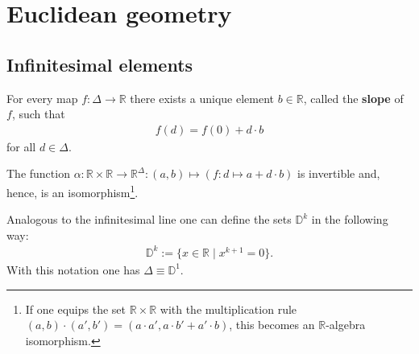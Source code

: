 \section{Euclidean geometry}
\subsection{Infinitesimal elements}


    \begin{axiom}\label{synth:kock_lawvere_axiom}
        For every map $f:\Delta\rightarrow\mathbb{R}$ there exists a unique element $b\in\mathbb{R}$, called the \textbf{slope} of $f$, such that
        \begin{gather}
            f(d) = f(0) + d\cdot b
        \end{gather}
        for all $d\in\Delta$.
    \end{axiom}
    \begin{result}
        The function $\alpha:\mathbb{R}\times\mathbb{R}\rightarrow \mathbb{R}^\Delta:(a,b)\mapsto(f:d\mapsto a+d\cdot b)$ is invertible and, hence, is an isomorphism\footnote{If one equips the set $\mathbb{R}\times\mathbb{R}$ with the multiplication rule $(a,b)\cdot(a',b') = (a\cdot a',a\cdot b' + a'\cdot b)$, this becomes an $\mathbb{R}$-algebra isomorphism.}.
    \end{result}

    \begin{notation}
        Analogous to the infinitesimal line one can define the sets $\mathbb{D}^k$ in the following way:
        \begin{gather}
            \mathbb{D}^k := \{x\in \mathbb{R}\mid x^{k+1} = 0\}.
        \end{gather}
        With this notation one has $\Delta\equiv\mathbb{D}^1$.
    \end{notation}

